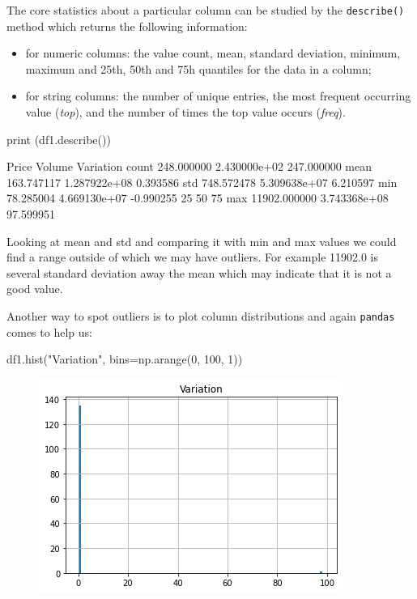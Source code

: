 The core statistics about a particular column can be studied by the \texttt{describe()} method which returns the following information:
\begin{itemize}
\tightlist
\item for numeric columns: the value count, mean, standard deviation, minimum, maximum and 25th, 50th and 75h quantiles for the data in a column;
\item for string columns: the number of unique entries, the most frequent occurring value (\emph{top}), and the number of times the top value occurs (\emph{freq}).
\end{itemize}

\begin{ipythonnon}
print (df1.describe())
\end{ipythonnon}
\begin{ioutput}
              Price        Volume   Variation
count    248.000000  2.430000e+02  247.000000
mean     163.747117  1.287922e+08    0.393586
std      748.572478  5.309638e+07    6.210597
min       78.285004  4.669130e+07   -0.990255
25%
50%
75%
max    11902.000000  3.743368e+08   97.599951
\end{ioutput}
        
Looking at mean and std and comparing it with min and max values we could find a range outside of which we may have outliers. For example 11902.0 is several standard deviation away the mean which may indicate that it is not a good value.

Another way to spot outliers is to plot column distributions and again \texttt{pandas} comes to help us:
\begin{ipythonnon}
df1.hist("Variation", bins=np.arange(0, 100, 1))
\end{ipythonnon}

\begin{figure}
	\centering
	\includegraphics[width=0.7\linewidth]{figures/volume_plot}
\end{figure}

